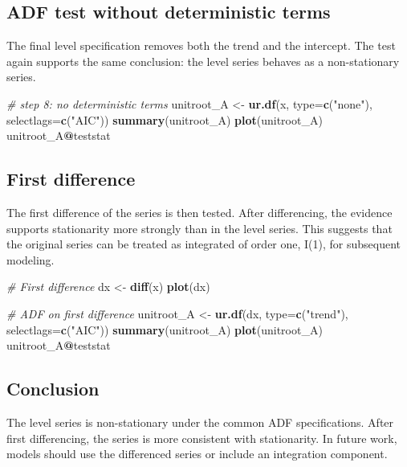 \documentclass[
  11pt,
]{article}
\newenvironment{Shaded}{\begin{snugshade}}{\end{snugshade}}
\newcommand{\AttributeTok}[1]{\textcolor[rgb]{0.13,0.29,0.53}{#1}}
\newcommand{\CommentTok}[1]{\textcolor[rgb]{0.56,0.35,0.01}{\textit{#1}}}
\newcommand{\FunctionTok}[1]{\textcolor[rgb]{0.13,0.29,0.53}{\textbf{#1}}}
\newcommand{\NormalTok}[1]{#1}
\newcommand{\OtherTok}[1]{\textcolor[rgb]{0.56,0.35,0.01}{#1}}
\newcommand{\SpecialCharTok}[1]{\textcolor[rgb]{0.81,0.36,0.00}{\textbf{#1}}}
\newcommand{\StringTok}[1]{\textcolor[rgb]{0.31,0.60,0.02}{#1}}
\begin{document}
\subsection{ADF test without deterministic
terms}\label{adf-test-without-deterministic-terms}

The final level specification removes both the trend and the intercept.
The test again supports the same conclusion: the level series behaves as
a non-stationary series.

\begin{Shaded}
\begin{Highlighting}[]
\CommentTok{\# step 8: no deterministic terms}
\NormalTok{unitroot\_A }\OtherTok{\textless{}{-}} \FunctionTok{ur.df}\NormalTok{(x, }\AttributeTok{type=}\FunctionTok{c}\NormalTok{(}\StringTok{"none"}\NormalTok{), }\AttributeTok{selectlags=}\FunctionTok{c}\NormalTok{(}\StringTok{"AIC"}\NormalTok{))}
\FunctionTok{summary}\NormalTok{(unitroot\_A)}
\FunctionTok{plot}\NormalTok{(unitroot\_A)}
\NormalTok{unitroot\_A}\SpecialCharTok{@}\NormalTok{teststat}
\end{Highlighting}
\end{Shaded}

\subsection{First difference}\label{first-difference}

The first difference of the series is then tested. After differencing,
the evidence supports stationarity more strongly than in the level
series. This suggests that the original series can be treated as
integrated of order one, I(1), for subsequent modeling.

\begin{Shaded}
\begin{Highlighting}[]
\CommentTok{\# First difference}
\NormalTok{dx }\OtherTok{\textless{}{-}} \FunctionTok{diff}\NormalTok{(x)}
\FunctionTok{plot}\NormalTok{(dx)}

\CommentTok{\# ADF on first difference}
\NormalTok{unitroot\_A }\OtherTok{\textless{}{-}} \FunctionTok{ur.df}\NormalTok{(dx, }\AttributeTok{type=}\FunctionTok{c}\NormalTok{(}\StringTok{"trend"}\NormalTok{), }\AttributeTok{selectlags=}\FunctionTok{c}\NormalTok{(}\StringTok{"AIC"}\NormalTok{))}
\FunctionTok{summary}\NormalTok{(unitroot\_A)}
\FunctionTok{plot}\NormalTok{(unitroot\_A)}
\NormalTok{unitroot\_A}\SpecialCharTok{@}\NormalTok{teststat}
\end{Highlighting}
\end{Shaded}

\subsection{Conclusion}\label{conclusion}

The level series is non-stationary under the common ADF specifications.
After first differencing, the series is more consistent with
stationarity. In future work, models should use the differenced series
or include an integration component.
\end{document}
